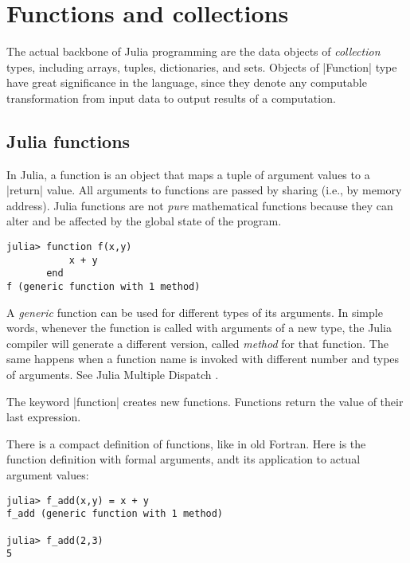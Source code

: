 \section{Functions and collections}\label{sect:1-1}
The actual backbone of Julia programming are the data objects of \emph{collection} types, including arrays, tuples, dictionaries, and sets. 
Objects of |Function| type have great significance in the language, since they denote any computable transformation from input data to output results of a computation.

\subsection{Julia functions}

In Julia, a function is an object that maps a tuple of argument values to a |return| value. 
All arguments to functions are passed by sharing (i.e., by memory address).
Julia functions are not \emph{pure} mathematical functions because they can alter and be affected by the global state of the program. 
\begin{definition}
\begin{lstlisting}[language=JuliaLocal, style=julia]
julia> function f(x,y)
           x + y
       end
f (generic function with 1 method)
\end{lstlisting}
\end{definition}

A \emph{generic} function can be used for different types of its arguments. In simple words, whenever the function is called with arguments of a new type, the Julia compiler will generate a different version, called \emph{method} for that function. The same happens when a function name is invoked with different number and types of arguments. See Julia Multiple Dispatch \cite{julia4data}.

The keyword |function| creates new functions. Functions return the value of their last expression.
\begin{definition}
There is a compact definition of functions, like in old Fortran. Here is the function definition with formal arguments, andt its application to actual argument values:

\begin{lstlisting}[language=JuliaLocal, style=julia]
julia> f_add(x,y) = x + y
f_add (generic function with 1 method)

julia> f_add(2,3) 
5
\end{lstlisting}
\end{definition}

